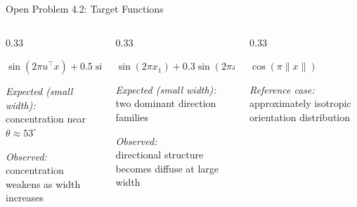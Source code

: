 \documentclass[aspectratio=169, 10pt]{beamer}
\begin{document}
\begin{frame}{Open Problem 4.2: Target Functions}
  \begin{columns}[T]
    \begin{column}{0.33\textwidth}
      \begin{tcolorbox}[slideboxA, title={Ridge}]
        \small
        $\sin(2\pi u^\top x) + 0.5\sin(4\pi u^\top x)$
        \vspace{4pt}

        \textit{Expected (small width):}\\
        concentration near $\theta \approx 53^\circ$
        \vspace{4pt}

        \textit{Observed:}\\
        concentration weakens as width increases
      \end{tcolorbox}
    \end{column}
    \begin{column}{0.33\textwidth}
      \begin{tcolorbox}[slideboxA, title={Separable}]
        \small
        $\sin(2\pi x_1) + 0.3\sin(2\pi x_2)$
        \vspace{4pt}

        \textit{Expected (small width):}\\
        two dominant direction families
        \vspace{4pt}

        \textit{Observed:}\\
        directional structure becomes diffuse at large width
      \end{tcolorbox}
    \end{column}
    \begin{column}{0.33\textwidth}
      \begin{tcolorbox}[slideboxC, title={Radial (reference)}]
        \small
        $\cos(\pi\|x\|)$
        \vspace{4pt}

        \textit{Reference case:}\\
        approximately isotropic orientation distribution
      \end{tcolorbox}
    \end{column}
  \end{columns}
\end{frame}
\end{document}
